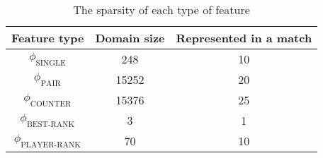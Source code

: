 \begin{center}
\begin{table}[h]
\begin{tabular}{|c|c|c|}
\hline
Feature type                & Domain size & Represented in a match \\ \hline
$\phi_{\text{SINGLE}}$      & 248         & 10                     \\ \hline
$\phi_{\text{PAIR}}$        & 15252       & 20                     \\ \hline
$\phi_{\text{COUNTER}}$     & 15376       & 25                     \\ \hline
$\phi_{\text{BEST-RANK}}$   & 3           & 1                      \\ \hline
$\phi_{\text{PLAYER-RANK}}$ & 70          & 10                     \\ \hline
\end{tabular}
\caption{The sparsity of each type of feature}\label{tab:featuresparsity}
\end{table}
\end{center}

